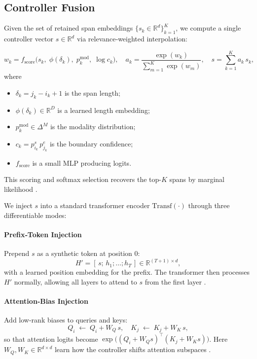 \subsection{Controller Fusion}

Given the set of retained span embeddings \(\{s_k\in\mathbb{R}^d\}_{k=1}^K\), we compute a single controller vector \(s\in\mathbb{R}^d\) via relevance‐weighted interpolation:

\[
w_k
= f_{\mathrm{score}}\bigl(
s_k,\;\phi(\delta_k),\;p^{\mathrm{mod}}_k,\;\log c_k
\bigr),
\quad
a_k
= \frac{\exp(w_k)}{\sum_{m=1}^K \exp(w_m)},
\quad
s = \sum_{k=1}^K a_k\,s_k,
\]
where
\begin{itemize}
	\item \(\delta_k = j_k - i_k + 1\) is the span length;
	\item \(\phi(\delta_k)\in\mathbb{R}^D\) is a learned length embedding;
	\item \(p^{\mathrm{mod}}_k\in\Delta^M\) is the modality distribution;
	\item \(c_k = p^s_{i_k}\,p^e_{j_k}\) is the boundary confidence;
	\item \(f_{\mathrm{score}}\) is a small MLP producing logits.
\end{itemize}
This scoring and softmax selection recovers the top-\(K\) spans by marginal likelihood \cite{vinyals2015pointer}.

We inject \(s\) into a standard transformer encoder \(\mathrm{Transf}(\cdot)\) through three differentiable modes:

\paragraph{Prefix‐Token Injection}
Prepend \(s\) as a synthetic token at position 0:
\[
H' = [\,s;\,h_1;\dots;h_T\,]\in\mathbb{R}^{(T+1)\times d},
\]
with a learned position embedding for the prefix.  The transformer then processes \(H'\) normally, allowing all layers to attend to \(s\) from the first layer \cite{li2021prefix}.

\paragraph{Attention‐Bias Injection}
Add low-rank biases to queries and keys:
\[
Q_i \;\leftarrow\; Q_i + W_Q\,s,\quad
K_j \;\leftarrow\; K_j + W_K\,s,
\]
so that attention logits become
\(\exp\bigl((Q_i+W_Qs)^{\!\intercal}(K_j+W_Ks)\bigr)\).  Here \(W_Q,W_K\in\mathbb{R}^{d\times d}\) learn how the controller shifts attention subspaces \cite{hu2021lora}.

